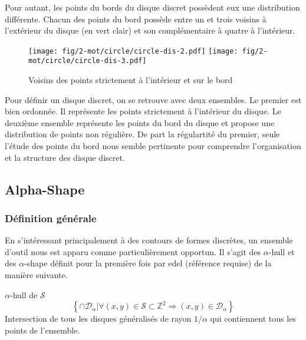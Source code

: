 Pour autant, les points du bords du disque discret possèdent eux une distribution différente. Chacun des points du bord possède entre un et trois voisins à l'extérieur du disque (en vert clair) et son complémentaire à quatre à l'intérieur.\\

\begin{figure}[H]
  \centering
  \texttt{[image: fig/2-mot/circle/circle-dis-2.pdf]}
  \texttt{[image: fig/2-mot/circle/circle-dis-3.pdf]}
  \caption{Voisins des points strictement à l'intérieur et sur le bord }
\end{figure}

Pour définir un disque discret, on se retrouve avec deux ensembles. Le premier est bien ordonnée. Il représente les points strictement à l'intérieur du disque. Le deuxième ensemble représente les points du bord du disque et propose une distribution de points non régulière. De part la régulartité du premier, seule l'étude des points du bord nous semble pertinente pour comprendre l'organisation et la structure des disque discret.


\subsection{Alpha-Shape}

\subsubsection{Définition générale}

En s'intéressant principalement à des contours de formes discrètes, un ensemble d'outil nous est apparu comme particulièrement opportun. Il s'agit des $\alpha$-hull et des $\alpha$-shape définit pour la première fois par edel (référence requise) de la manière suivante.

\begin{Definition}{$\alpha$-hull de $\mathcal{S}$}
\label{def:ah}
    $$\left\{ \cap \mathcal{D}_{\alpha} | \forall (x,y)\in \mathcal{S} \subset \mathbb{Z}^{2} \Rightarrow (x,y) \in \mathcal{D}_{\alpha} \right\}$$
    Intersection de tous les disques généralisés de rayon $1/\alpha$ qui contiennent tous les points de l'ensemble.
\end{Definition}

